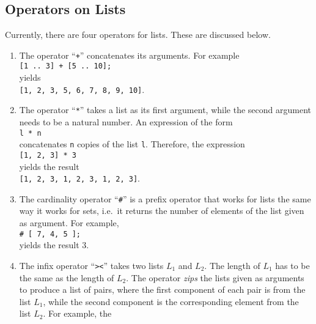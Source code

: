 \subsection{Operators on Lists}
Currently, there are four operators for lists.  These are discussed below.
\begin{enumerate}
\item The operator ``\texttt{+}'' concatenates its arguments.  For example
      \\[0.2cm]
      \hspace*{1.3cm}
      \texttt{[1 .. 3] + [5 .. 10];}
      \\[0.2cm]
      yields 
      \\[0.2cm]
      \hspace*{1.3cm}
      \texttt{[1, 2, 3, 5, 6, 7, 8, 9, 10]}.
\item The operator ``\texttt{*}'' takes a list as its first argument,  while the second argument
      needs to be a natural number.  An expression of the form 
      \\[0.2cm]
      \hspace*{1.3cm}
      \texttt{l * n}
      \\[0.2cm]
      concatenates \texttt{n} copies of the list \texttt{l}.  Therefore, the expression
      \\[0.2cm]
      \hspace*{1.3cm}
      \texttt{[1, 2, 3] * 3}
      \\[0.2cm]
      yields the result
      \\[0.2cm]
      \hspace*{1.3cm}
      \texttt{[1, 2, 3, 1, 2, 3, 1, 2, 3]}.
\item The cardinality operator ``\texttt{\#}'' is a prefix operator that works for lists the same
      way it works for sets, i.e.~it returns the number of elements of the list given as argument.  For example,
      \\[0.2cm]
      \hspace*{1.3cm}
      \texttt{\# [ 7, 4, 5 ];}
      \\[0.2cm]
      yields the result $3$.
\item The infix operator ``\texttt{><}'' takes two lists $L_1$ and $L_2$.  The length of $L_1$ has
      to be the same as the length of $L_2$.  The operator \emph{zips} the lists given as arguments
      to produce a list of pairs, where the first component of each  pair is from the list $L_1$,
      while the second component is the corresponding element from the list $L_2$.  For example, the

\end{enumerate}
